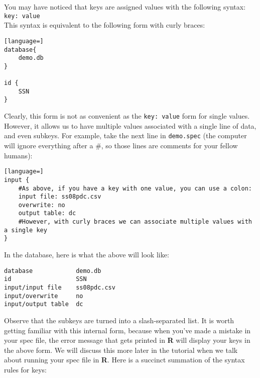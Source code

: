 \documentclass{article}
\begin{document}
You may have noticed that keys are assigned values with the following syntax:\\

{\tt key: value}\\

This syntax is equivalent to the following form with curly braces:
\begin{lstlisting}[language=]
database{
	demo.db
}

id {
	SSN
}
\end{lstlisting}

Clearly, this form is not as convenient as the {\tt key: value} form for single values. However, it allows 
us to have multiple values associated with a single line of data, and even subkeys. For example, take  
the next line in {\tt demo.spec} (the computer will 
ignore everything after a \#, so those lines are comments for your fellow humans):

\begin{lstlisting}[language=]
input {
    #As above, if you have a key with one value, you can use a colon:
    input file: ss08pdc.csv
    overwrite: no
    output table: dc
	#However, with curly braces we can associate multiple values with a single key
}
\end{lstlisting}


In the database, here is what the above will look like:
\begin{verbatim}
database            demo.db
id                  SSN
input/input file    ss08pdc.csv
input/overwrite     no
input/output table  dc
\end{verbatim}

Observe that the subkeys are turned into a slash-separated list. It is 
worth getting familiar with this internal form, because when you've made a 
mistake in your spec file, the error message that gets printed in \textbf{R} 
will display your keys in the above form. We will discuss this more later in the 
tutorial when we talk about running your spec file in \textbf{R}.
Here is a succinct summation of the syntax rules for keys:
\end{document}
